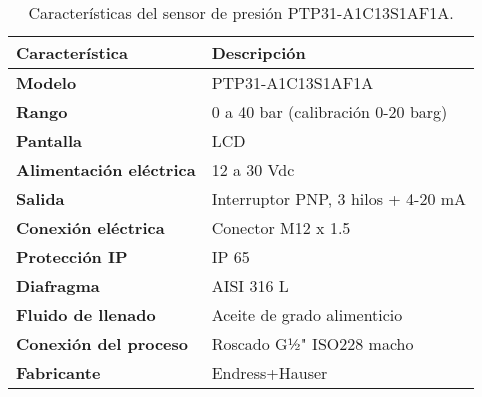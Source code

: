 \begin{table}[H]
    \centering
    \caption{Características del sensor de presión PTP31-A1C13S1AF1A. }
    \label{table:sensor_transmisor_presion}
    \begin{tabular}{| L{6cm} | L{6cm} |}
        \hline
        \textbf{Característica} & \textbf{Descripción}  \\
        \hline
        \textbf{Modelo} & PTP31-A1C13S1AF1A  \\
        \hline
        \textbf{Rango} & 0 a 40 bar (calibración 0-20 barg)  \\
        \hline
        \textbf{Pantalla} & LCD  \\
        \hline
        \textbf{Alimentación eléctrica} & 12 a 30 Vdc  \\
        \hline
        \textbf{Salida} & Interruptor PNP, 3 hilos + 4-20 mA  \\
        \hline
        \textbf{Conexión eléctrica} & Conector M12 x 1.5  \\
        \hline
        \textbf{Protección IP} & IP 65  \\
        \hline
        \textbf{Diafragma} & AISI 316 L  \\
        \hline
        \textbf{Fluido de llenado} & Aceite de grado alimenticio  \\
        \hline
        \textbf{Conexión del proceso} & Roscado G½" ISO228 macho  \\
        \hline
        \textbf{Fabricante} & Endress+Hauser  \\
        \hline
    \end{tabular}
\end{table}

